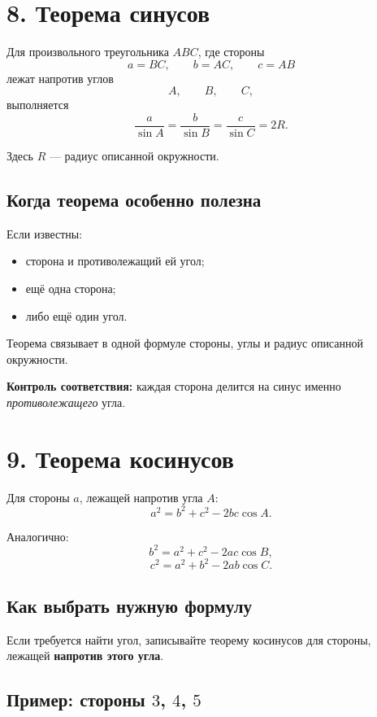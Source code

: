 \documentclass[a4paper,12pt]{article}
\newcommand{\key}[1]{\textcolor{darkaccent}{\textbf{#1}}}
\begin{document}
\newpage
\section*{\textcolor{darkaccent}{8. Теорема синусов}}

Для произвольного треугольника \(ABC\), где стороны
\[
a=BC,\qquad b=AC,\qquad c=AB
\]
лежат напротив углов
\[
A,\qquad B,\qquad C,
\]
выполняется
\[
\boxed{
\frac{a}{\sin A}
=
\frac{b}{\sin B}
=
\frac{c}{\sin C}
=
2R.
}
\]

Здесь \(R\) --- радиус описанной окружности.

\subsection*{Когда теорема особенно полезна}

Если известны:

\begin{itemize}
    \item сторона и противолежащий ей угол;
    \item ещё одна сторона;
    \item либо ещё один угол.
\end{itemize}

Теорема связывает в одной формуле стороны, углы и радиус описанной окружности.

\key{Контроль соответствия:} каждая сторона делится на синус именно \emph{противолежащего} угла.


\section*{\textcolor{darkaccent}{9. Теорема косинусов}}

Для стороны \(a\), лежащей напротив угла \(A\):
\[
\boxed{
a^2=b^2+c^2-2bc\cos A.
}
\]

Аналогично:
\[
b^2=a^2+c^2-2ac\cos B,
\]
\[
c^2=a^2+b^2-2ab\cos C.
\]

\subsection*{Как выбрать нужную формулу}

Если требуется найти угол, записывайте теорему косинусов для стороны, лежащей \textbf{напротив этого угла}.

\subsection*{Пример: стороны \(3\), \(4\), \(5\)}
\end{document}
